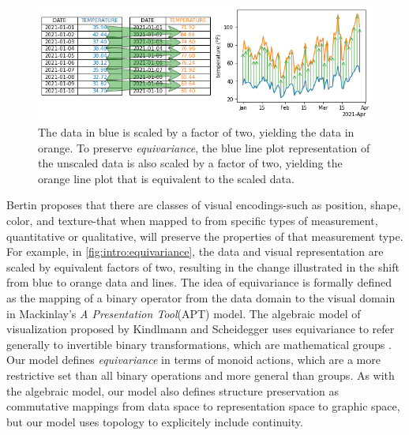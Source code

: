 \documentclass[../main.tex]{subfiles}
\begin{document}
\begin{figure}[H]
        \includegraphics[width=1\columnwidth]{figures/intro/equivariant.png}
        \caption{The data in blue is scaled by a factor of two, yielding the data in orange. To preserve \textit{equivariance}, the blue line plot representation of the unscaled data is also scaled by a factor of two, yielding the orange line plot that is equivalent to the scaled data.}
        \label{fig:intro:equivariance}
\end{figure}
Bertin proposes that there are classes of visual encodings-such as position, shape, color, and texture-that when mapped to from specific types of measurement, quantitative or qualitative, will preserve the properties of that measurement type. For example, in \autoref{fig:intro:equivariance}, the data and visual representation are scaled by equivalent factors of two, resulting in the change illustrated in the shift from blue to orange data and lines. The idea of equivariance is formally defined as the mapping of a binary operator from the data domain to the visual domain in Mackinlay's \textit{A Presentation Tool}(APT) model\cite{mackinlayAutomatingDesignGraphical1986, mackinlayAutomaticDesignGraphical1987}. The algebraic model of visualization proposed by Kindlmann and Scheidegger uses equivariance to refer generally to invertible binary transformations\cite{kindlmannAlgebraicProcessVisualization2014}, which are mathematical groups \cite{shadrachIntroductionGroups2017}. Our model defines \textit{equivariance} in terms of monoid actions, which are a more restrictive set than all binary operations and more general than groups. As with the algebraic model, our model also defines structure preservation as commutative mappings from data space to representation space to graphic space, but our model uses topology to explicitely include continuity.
\end{document}
